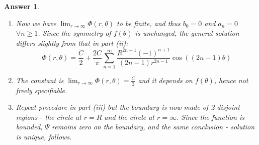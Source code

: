 \documentclass[a4paper]{article}
\newtheorem{ans}{Answer}[section]
\theoremstyle{new}
\begin{document}
\begin{ans}
\begin{enumerate}[label=(\roman*)]
Since $\Psi=0$ along $\partial D$, $\int_{\partial D}\Psi\boldsymbol{\nabla}\Psi dl=0$. But $\nabla^2\Psi=\nabla^2\tilde{\Phi}-\nabla^2\Phi=0$, so $\int_D\Psi\nabla^2\Psi dA=0\implies\boldsymbol{\nabla}\Psi=\boldsymbol{0}$ $\forall D$. But yet $\Psi=0$ on $r=R$, then $\Phi=\tilde{\Phi}$ and the solution is unique.
\item
Now we have $\lim_{r\rightarrow\infty}\Phi(r,\theta)$ to be finite, and thus $b_0=0$ and $a_n=0$ $\forall n\geq1$. Since the symmetry of $f(\theta)$ is unchanged, the general solution differs slightly from that in part (ii):
$$\Phi(r,\theta)=\frac{C}{2}+\frac{2C}{\pi}\sum_{n=1}^\infty\frac{R^{2n-1}(-1)^{n+1}}{(2n-1)r^{2n-1}}\cos((2n-1)\theta)$$
\item The constant is $\lim_{r\rightarrow\infty}\Phi(r,\theta)=\frac{C}{2}$ and it depends on $f(\theta)$, hence not freely specifiable.
\item Repeat procedure in part (iii) but the boundary is now made of 2 disjoint regions - the circle at $r=R$ and the circle at $r=\infty$. Since the function is bounded, $\Psi$ remains zero on the boundary, and the same conclusion - solution is unique, follows.
\end{enumerate}
\end{ans}
\newpage
\end{document}
